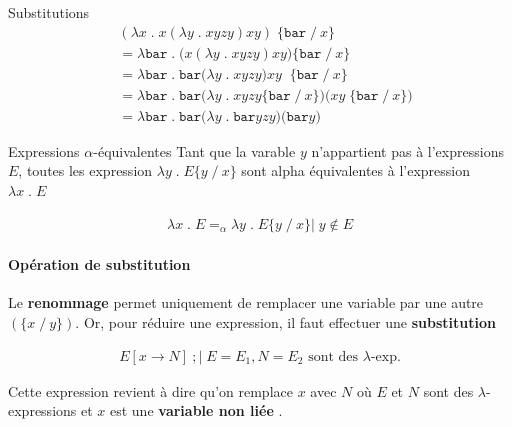 \documentclass{report}
\begin{document}
\begin{multicols*}{3}
\begin{EExample}{Substitutions}{}
      \begin{align*}
        &(\lambda x  \; . \; x (\lambda y \; . \; x y z y) x y)   
        \; \{ \texttt{bar} \; /\ x  \}
        \\
        &= 
        \lambda \texttt{bar} \; . \; 
        \bigl( x (\lambda y \; . \; x y z y) x y\bigr) 
          \{\texttt{bar} \; /\ x \}
         \\
        &=
        \lambda \texttt{bar}  \; . \; \texttt{bar}  
        \bigl(\lambda y \; . \; x y z y\bigr) x y \; 
          \; \{\texttt{bar} \; /\ x \}
        \\
        &=
        \lambda \texttt{bar}  \; . \; \texttt{bar}  
        \bigl(\lambda y \; . \; x y z y \{\texttt{bar} \; /\ x   \} \bigr)
        \bigl( x y \; \{\texttt{bar} \; /\ x \} \bigr) \\
        &= 
        \lambda \texttt{bar} \; . \; \texttt{bar}
        \bigl(\lambda y \; . \; \texttt{bar}yzy   \bigr)
        \bigl( \texttt{bar} y \bigr)
      \end{align*}
  \end{EExample}

  \begin{Theorem}{Expressions $\alpha$-équivalentes}{}
      Tant que la varable $y$ n'appartient pas à l'expressions 
      $E$, toutes les expression $\lambda y \; . \; E \{ y \; /\ x \}$ 
      sont alpha équivalentes à l'expression $\lambda x \; . \; E$

      \begin{align*}
        \lambda x \; . \; E =_{\alpha} \lambda y \; . \; E \{y \; /\ x \}
        \big| \; y \notin E
      \end{align*}
  \end{Theorem}

  \paragraph{Opération de substitution} 
  Le \textbf{renommage} permet uniquement de remplacer une variable 
  par une autre $(\{ x \; /\ y \})$. Or, pour réduire une 
  expression, il faut effectuer une \textbf{substitution}  

  \begin{align*}
    E[x \rightarrow N] \ ; \Big| \; E = E_1, N = E_2 
    \text{ sont des } \lambda\text{-exp}.
  \end{align*}

  Cette expression revient à dire qu'on remplace $x$ avec 
  $N$ où $E$ et $N$ sont des $\lambda$-expressions et $x$ est 
  une \textbf{variable non liée}  . 


\end{multicols*}
\end{document}
